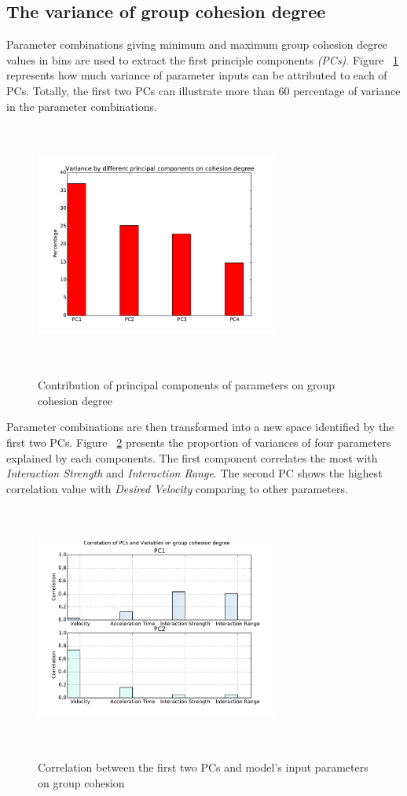 \documentclass[a4paper,11pt,phdthesis,singlespace,twoside]{cssethesis}
\begin{document}
\subsection{The variance of group cohesion degree}
Parameter combinations giving minimum and maximum group cohesion degree values in bins are used to extract the first principle components \textit{(PCs)}. Figure ~\ref{fig:group_cohesion_pca_weight} represents how much variance of parameter inputs can be attributed to each of PCs. Totally, the first two PCs can illustrate more than 60 percentage of variance in the parameter combinations.
\begin{figure}[H]
\begin{center}
{\includegraphics[width=8cm,height=8cm]{figs/pc_c_d.pdf}}
\end{center}
\caption{Contribution of principal components of parameters on group cohesion degree}
\label{fig:group_cohesion_pca_weight}
\end{figure}
Parameter combinations are then transformed into a new space identified by the first two PCs. Figure ~\ref{fig:pca_corr_group_cohesion} presents the proportion of variances of four parameters explained by each components. The first component correlates the most with \textit{Interaction Strength} and \textit{Interaction Range}. The second PC shows the highest correlation value with \textit{Desired Velocity} comparing to other parameters.
\begin{figure}[H]
\begin{center}
{\includegraphics[width=8cm,height=8cm]{figs/pca_corr_group_cohesion.pdf}}
\end{center}
\caption{Correlation between the first two PCs and model's input parameters on group cohesion}
\label{fig:pca_corr_group_cohesion}
\end{figure}
\end{document}
